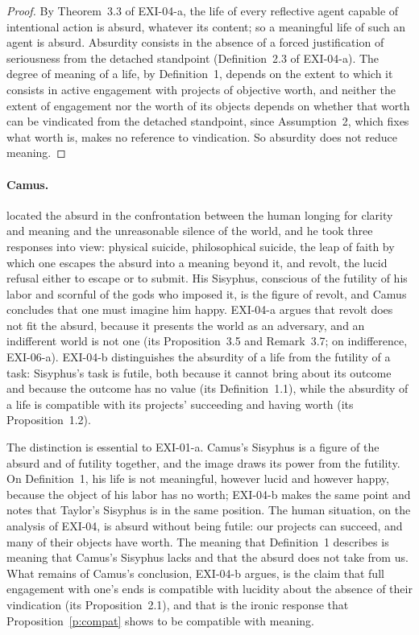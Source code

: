 \begin{proof}
By Theorem~3.3 of EXI-04-a, the life of every reflective agent capable of intentional action is absurd, whatever its content; so a meaningful life of such an agent is absurd. Absurdity consists in the absence of a forced justification of seriousness from the detached standpoint (Definition~2.3 of EXI-04-a). The degree of meaning of a life, by Definition~1, depends on the extent to which it consists in active engagement with projects of objective worth, and neither the extent of engagement nor the worth of its objects depends on whether that worth can be vindicated from the detached standpoint, since Assumption~2, which fixes what worth is, makes no reference to vindication. So absurdity does not reduce meaning.
\end{proof}

\paragraph{Camus.} \citet{Camus1955} located the absurd in the confrontation between the human longing for clarity and meaning and the unreasonable silence of the world, and he took three responses into view: physical suicide, philosophical suicide, the leap of faith by which one escapes the absurd into a meaning beyond it, and revolt, the lucid refusal either to escape or to submit. His Sisyphus, conscious of the futility of his labor and scornful of the gods who imposed it, is the figure of revolt, and Camus concludes that one must imagine him happy. EXI-04-a argues that revolt does not fit the absurd, because it presents the world as an adversary, and an indifferent world is not one (its Proposition~3.5 and Remark~3.7; on indifference, EXI-06-a). EXI-04-b distinguishes the absurdity of a life from the futility of a task: Sisyphus's task is futile, both because it cannot bring about its outcome and because the outcome has no value (its Definition~1.1), while the absurdity of a life is compatible with its projects' succeeding and having worth (its Proposition~1.2).

The distinction is essential to EXI-01-a. Camus's Sisyphus is a figure of the absurd and of futility together, and the image draws its power from the futility. On Definition~1, his life is not meaningful, however lucid and however happy, because the object of his labor has no worth; EXI-04-b makes the same point and notes that Taylor's Sisyphus is in the same position. The human situation, on the analysis of EXI-04, is absurd without being futile: our projects can succeed, and many of their objects have worth. The meaning that Definition~1 describes is meaning that Camus's Sisyphus lacks and that the absurd does not take from us. What remains of Camus's conclusion, EXI-04-b argues, is the claim that full engagement with one's ends is compatible with lucidity about the absence of their vindication (its Proposition~2.1), and that is the ironic response that Proposition~\ref{p:compat} shows to be compatible with meaning.


